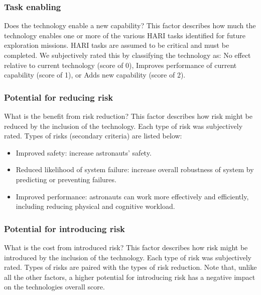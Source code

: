 \subsubsection{Task enabling}
Does the technology enable a new capability? This factor describes how much the technology enables one or more of the various HARI tasks identified for future exploration missions.
HARI tasks are assumed to be critical and must be completed.
We subjectively rated this by classifying the technology as: No effect relative to current technology (score of 0), Improves performance of current capability (score of 1), or Adds new capability (score of 2).

\subsubsection{Potential for reducing risk}
What is the benefit from risk reduction? This factor describes how risk might be reduced by the inclusion of the technology.
Each type of risk was subjectively rated.
Types of risks (secondary criteria) are listed below:
\begin{itemize}
    \item Improved safety: increase astronauts' safety.
    \item Reduced likelihood of system failure: increase overall robustness of system by predicting or preventing failures.
    \item Improved performance: astronauts can work more effectively and efficiently, including reducing physical and cognitive workload.
\end{itemize}

\subsubsection{Potential for introducing risk}
What is the cost from introduced risk? This factor describes how risk might be introduced by the inclusion of the technology.
Each type of risk was subjectively rated.
Types of risks are paired with the types of risk reduction.
Note that, unlike all the other factors, a higher potential for introducing risk has a negative impact on the technologies overall score.

